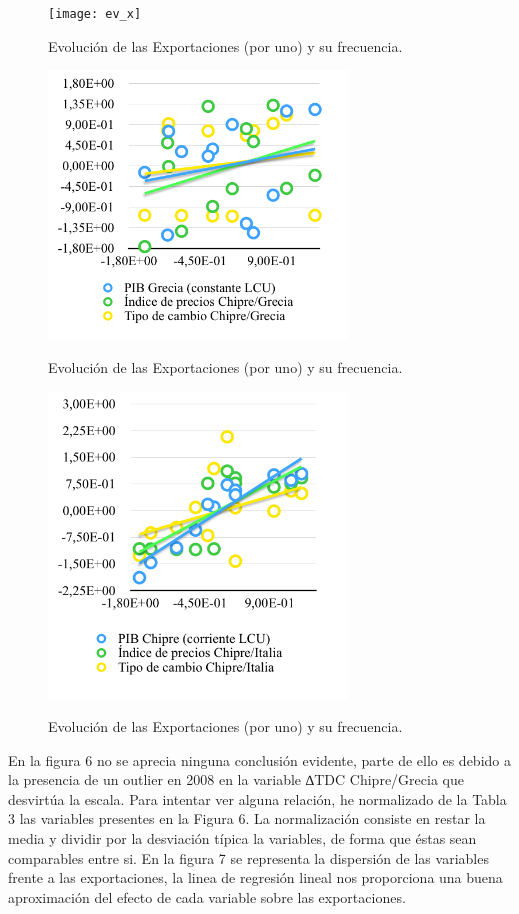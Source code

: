 \documentclass[a4paper,openright,12pt]{book}
\begin{document}
\begin{figure}[ht]
    \caption{Evolución de las Exportaciones (por uno) y su frecuencia.}
    \centering
    \texttt{[image: ev\_x]}
    \label{ev_x}

\end{figure}
\begin{figure}[ht]
    \caption{Evolución de las Exportaciones (por uno) y su frecuencia.}
    \centering
    \includegraphics[width=300px]{disp_x.png}
    \label{disp_x}
\end{figure}

\begin{figure}[ht]
    \caption{Evolución de las Exportaciones (por uno) y su frecuencia.}
    \centering
    \includegraphics[width=300px]{disp_m.png}
    \label{disp_m}
\end{figure}

En la figura 6 no se aprecia ninguna conclusión evidente, parte de ello es debido a la presencia de un outlier en 2008 en la variable ∆TDC Chipre/Grecia que desvirtúa la escala.
Para intentar ver alguna relación, he normalizado de la Tabla 3 las variables presentes en la Figura 6. La normalización consiste en restar la media y dividir por la desviación típica la variables, de forma que éstas sean comparables entre si.
En la figura 7 se representa la dispersión de las variables frente a las exportaciones, la linea de regresión lineal nos proporciona una buena aproximación del efecto de cada variable sobre las exportaciones.
\end{document}
